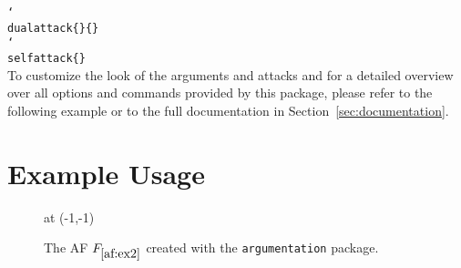 \documentclass{scrartcl}
\newcommand{\argumentation}{\texttt{argumentation}\xspace}
\newcommand{\opt}[2][red]{\textcolor{#1}{\ttfamily \meta{#2}}}
\DeclareRobustCommand\cs[2][-1.6cm]{\hspace{#1}\texttt{\char`\\#2}}
\begin{document}
\noindent\cs[0cm]{dualattack\{\opt{a1}\}\{\opt{a2}\}}\\
\noindent\cs[0cm]{selfattack\{\opt{a1}\}}\\


To customize the look of the arguments and attacks and for a detailed overview over all options and commands provided by this package, please refer to the following example or to the full documentation in Section~\ref{sec:documentation}.


\newpage
\section{Example Usage}\label{sec:example}
\vspace{-0.5cm}
\begin{figure}[ht]
    \centering
    \begin{af}[namestyle=math]


         at (-1,-1)

        

        \label{af:ex2}
    \end{af}
    \caption{The AF $F_{\ref{af:ex2}}$ created with the \argumentation package.}
    \label{fig:example}
\end{figure}
\end{document}
